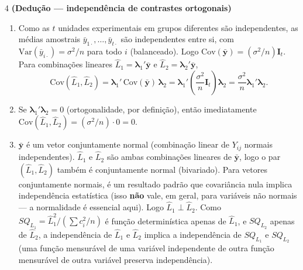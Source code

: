 \documentclass[11pt]{article}
\begin{document}
\begin{questao}{4} \textbf{(Dedução --- independência de contrastes ortogonais)}
\end{questao}
\begin{solucao}
\begin{enumerate}[label=(\alph*)]
  \item Como as $t$ unidades experimentais em grupos diferentes são independentes, as médias
    amostrais $\bar y_{1\cdot},\ldots,\bar y_{t\cdot}$ são independentes entre si, com
    $\mathrm{Var}(\bar y_{i\cdot}) = \sigma^2/n$ para todo $i$ (balanceado). Logo
    $\mathrm{Cov}(\bar{\mathbf y}) = (\sigma^2/n)\mathbf I_t$. Para combinações lineares
    $\hat L_1 = \boldsymbol\lambda_1'\bar{\mathbf y}$ e $\hat L_2 = \boldsymbol\lambda_2'\bar{\mathbf y}$,
    \[
    \mathrm{Cov}(\hat L_1,\hat L_2) = \boldsymbol\lambda_1'\,\mathrm{Cov}(\bar{\mathbf y})\,
    \boldsymbol\lambda_2 = \boldsymbol\lambda_1'\left(\frac{\sigma^2}{n}\mathbf I_t\right)
    \boldsymbol\lambda_2 = \frac{\sigma^2}{n}\boldsymbol\lambda_1'\boldsymbol\lambda_2.
    \]
  \item Se $\boldsymbol\lambda_1'\boldsymbol\lambda_2=0$ (ortogonalidade, por definição), então
    imediatamente $\mathrm{Cov}(\hat L_1,\hat L_2) = (\sigma^2/n)\cdot 0 = 0$.
  \item $\bar{\mathbf y}$ é um vetor conjuntamente normal (combinação linear de $Y_{ij}$ normais
    independentes). $\hat L_1$ e $\hat L_2$ são ambas combinações lineares de $\bar{\mathbf y}$,
    logo o par $(\hat L_1, \hat L_2)$ também é conjuntamente normal (bivariado). Para vetores
    conjuntamente normais, é um resultado padrão que covariância nula implica independência
    estatística (isso \textbf{não} vale, em geral, para variáveis não normais — a normalidade é
    essencial aqui). Logo $\hat L_1 \perp \hat L_2$. Como $SQ_{L_1} = \hat L_1^2/(\sum c_i^2/n)$ é
    função determinística apenas de $\hat L_1$, e $SQ_{L_2}$ apenas de $\hat L_2$, a independência
    de $\hat L_1$ e $\hat L_2$ implica a independência de $SQ_{L_1}$ e $SQ_{L_2}$ (uma função
    mensurável de uma variável independente de outra função mensurável de outra variável
    preserva independência).
\end{enumerate}
\end{solucao}
\end{document}
